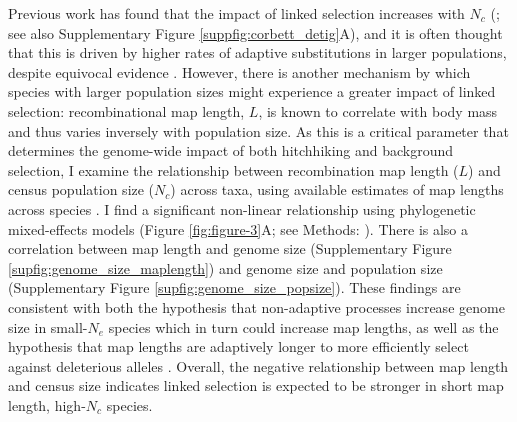 \documentclass[11pt]{article}
\newcommand{\Newnameref}[1]{\textit{\nameref{#1}}}
\begin{document}
Previous work has found that the impact of linked selection increases with
$N_c$ (\cite{Corbett-Detig2015-gt}; see also Supplementary Figure
\ref{suppfig:corbett_detig}A), and it is often thought that this is driven by
higher rates of adaptive substitutions in larger populations, despite equivocal
evidence \parencite{Galtier2016-dq}. However, there is another mechanism by
which species with larger population sizes might experience a greater impact of
linked selection: recombinational map length, $L$, is known to correlate with
body mass \parencite{Burt1987-tq} and thus varies inversely with population
size. As this is a critical parameter that determines the genome-wide impact of
both hitchhiking and background selection, I examine the relationship between
recombination map length ($L$) and census population size ($N_c$) across taxa,
using available estimates of map lengths across species
\parencite{Stapley2017-fs,Corbett-Detig2015-gt}. I find a significant
non-linear relationship using phylogenetic mixed-effects models (Figure
\ref{fig:figure-3}A; see Methods: \Newnameref{sec:methods-pcm}). There is also
a correlation between map length and genome size (Supplementary Figure
\ref{supfig:genome_size_maplength}) and genome size and population size
(Supplementary Figure \ref{supfig:genome_size_popsize}). These findings are
consistent with both the hypothesis that non-adaptive processes increase genome
size in small-$N_e$ species \parencite{Lynch2003-bn} which in turn could
increase map lengths, as well as the hypothesis that map lengths are adaptively
longer to more efficiently select against deleterious alleles
\parencite{Roze2021-ya}. Overall, the negative relationship between map length
and census size indicates linked selection is expected to be stronger in short
map length, high-$N_c$ species.
\end{document}
